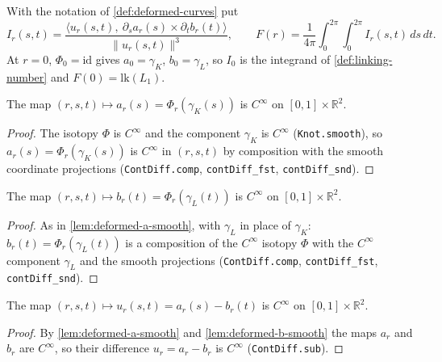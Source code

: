 \begin{definition}
    \label{def:deformed-linking}
    With the notation of \cref{def:deformed-curves} put
    \[
        I_r(s,t) = \frac{\bigl\langle u_r(s,t),\ \partial_s a_r(s)\times\partial_t b_r(t)\bigr\rangle}
                        {\lVert u_r(s,t)\rVert^{3}},
        \qquad
        F(r) = \frac{1}{4\pi}\int_0^{2\pi}\!\!\int_0^{2\pi} I_r(s,t)\,ds\,dt .
    \]
    At $r=0$, $\Phi_0=\mathrm{id}$ gives $a_0=\gamma_K$, $b_0=\gamma_L$, so
    $I_0$ is the integrand of \cref{def:linking-number} and $F(0) = \mathrm{lk}(L_1)$.
\end{definition}

\begin{lemma}
    \label{lem:deformed-a-smooth}
    The map $(r,s,t)\mapsto a_r(s)=\Phi_r(\gamma_K(s))$ is $C^\infty$ on
    $[0,1]\times\mathbb{R}^2$.
\end{lemma}
\begin{proof}
    The isotopy $\Phi$ is $C^\infty$ and the component $\gamma_K$ is $C^\infty$
    (\texttt{Knot.smooth}), so $a_r(s)=\Phi_r(\gamma_K(s))$ is $C^\infty$ in
    $(r,s,t)$ by composition with the smooth coordinate projections
    (\texttt{ContDiff.comp}, \texttt{contDiff\_fst}, \texttt{contDiff\_snd}).
\end{proof}

\begin{lemma}
    \label{lem:deformed-b-smooth}
    The map $(r,s,t)\mapsto b_r(t)=\Phi_r(\gamma_L(t))$ is $C^\infty$ on
    $[0,1]\times\mathbb{R}^2$.
\end{lemma}
\begin{proof}
    As in \cref{lem:deformed-a-smooth}, with $\gamma_L$ in place of $\gamma_K$:
    $b_r(t)=\Phi_r(\gamma_L(t))$ is a composition of the $C^\infty$ isotopy $\Phi$
    with the $C^\infty$ component $\gamma_L$ and the smooth projections
    (\texttt{ContDiff.comp}, \texttt{contDiff\_fst}, \texttt{contDiff\_snd}).
\end{proof}

\begin{lemma}
    \label{lem:deformed-u-smooth}
    The map $(r,s,t)\mapsto u_r(s,t)=a_r(s)-b_r(t)$ is $C^\infty$ on
    $[0,1]\times\mathbb{R}^2$.
\end{lemma}
\begin{proof}
    By \cref{lem:deformed-a-smooth} and \cref{lem:deformed-b-smooth} the maps $a_r$
    and $b_r$ are $C^\infty$, so their difference $u_r=a_r-b_r$ is $C^\infty$
    (\texttt{ContDiff.sub}).
\end{proof}

